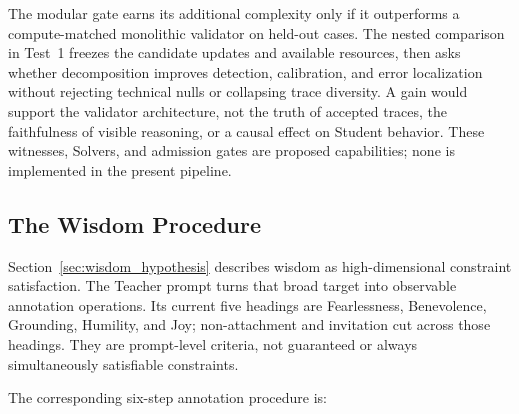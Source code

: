 The modular gate earns its additional complexity only if it outperforms a
compute-matched monolithic validator on held-out cases. The nested comparison
in Test~1 freezes the candidate updates and available resources, then asks
whether decomposition improves detection, calibration, and error localization
without rejecting technical nulls or collapsing trace diversity. A gain would
support the validator architecture, not the truth of accepted traces, the
faithfulness of visible reasoning, or a causal effect on Student behavior.
These witnesses, Solvers, and admission gates are proposed capabilities; none
is implemented in the present pipeline.

\subsection{The Wisdom Procedure}\label{sec:wisdom-procedure}

Section~\ref{sec:wisdom_hypothesis} describes wisdom as high-dimensional
constraint satisfaction. The Teacher prompt turns that broad target into
observable annotation operations. Its current five headings are Fearlessness,
Benevolence, Grounding, Humility, and Joy; non-attachment and invitation cut
across those headings. They are prompt-level criteria, not guaranteed or always
simultaneously satisfiable constraints.

The corresponding six-step annotation procedure is:

